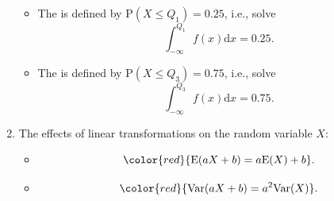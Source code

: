 \documentclass[12pt, a4paper]{article}
\def\E{{\mathbb{E}}}
\def\d{{\mathrm{d}}}
\def\P{\mathrm{P}}
\def\Var{\mathrm{Var}}
\def\E{\mathrm{E}}
\begin{document}
\begin{enumerate}
    \begin{itemize}
        \item The \textbf{\color{red}{lower quartile $Q_1$}} is defined by $\P(X\leq Q_1)=0.25$, i.e., solve $$\int_{-\infty}^{Q_1}f(x)\d x=0.25.$$
        \item The \textbf{\color{red}{upper quartile $Q_3$}} is defined by $\P(X\leq Q_3)=0.75$, i.e., solve $$\int_{-\infty}^{Q_3}f(x)\d x=0.75.$$
    \end{itemize}
    \item The effects of linear transformations on the random variable $X$: 
    \begin{itemize}
        \item $${\color{red}{\E(aX+b)=a\E(X)+b}}.$$
        \item $${\color{red}{\Var(aX+b)=a^2\Var(X)}}.$$
    \end{itemize}
\end{enumerate}
\end{document}
